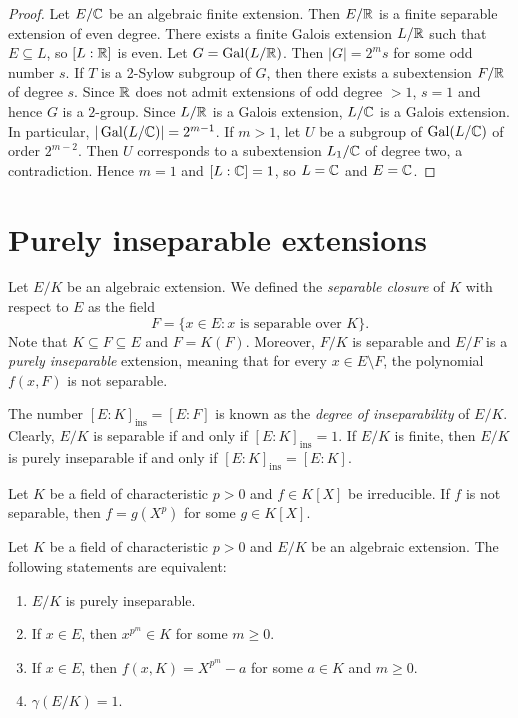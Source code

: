 \begin{proof}
    Let $E/\mathbb{C}$ be an algebraic finite extension. Then $E/\mathbb{R}$ 
    is a finite separable extension of even degree. There exists a finite Galois
    extension 
    $L/\mathbb{R}$ such that $E\subseteq L$, so $[L:\mathbb{R}]$ is even. Let $G=\operatorname{Gal}(L/\mathbb{R})$. 
    Then $|G|=2^ms$ for some odd number $s$. If $T$ is a 2-Sylow subgroup
    of $G$, 
    then there exists a subextension $F/\mathbb{R}$ of degree $s$. Since 
    $\mathbb{R}$ does not admit extensions of odd degree $>1$, $s=1$ and
    hence $G$ is a $2$-group. Since 
    $L/\mathbb{R}$ is a Galois extension, $L/\mathbb{C}$ is a Galois extension. 
    In particular, $|\operatorname{Gal}(L/\mathbb{C})|=2^{m-1}$. If $m>1$, 
    let $U$ be a subgroup of $\operatorname{Gal}(L/\mathbb{C})$ of order $2^{m-2}$. Then $U$ corresponds 
    to a subextension $L_1/\mathbb{C}$ of degree two, a contradiction. Hence $m=1$ 
    and $[L:\mathbb{C}]=1$, so $L=\mathbb{C}$ and $E=\mathbb{C}$. 
\end{proof}

\section{Purely inseparable extensions}

Let $E/K$ be an algebraic extension. 
We defined the 
\emph{separable closure} of $K$ with respect to $E$ as 
the field 
\[
    F=\{x\in E:x\text{ is separable over }K\}.
\]
Note that $K\subseteq F\subseteq E$ 
and $F=K(F)$. Moreover, 
$F/K$ is separable and 
$E/F$ is a \emph{purely inseparable} extension, meaning that
for every $x\in E\setminus F$, the polynomial $f(x,F)$ is not separable. 

The number $[E:K]_{\operatorname{ins}}=[E:F]$ is known as the
\emph{degree of inseparability} of $E/K$.
Clearly, $E/K$ is separable if and only if
$[E:K]_{\operatorname{ins}}=1$.
If $E/K$ is finite, then $E/K$ is purely inseparable if and only if
$[E:K]_{\operatorname{ins}}=[E:K]$.

\begin{exercise}
    \label{xca:separable_charp}
    Let $K$ be a field of characteristic $p>0$ and $f\in K[X]$ be irreducible.
    If $f$ is not separable, then $f=g(X^p)$ for some $g\in K[X]$. 
\end{exercise}



\begin{proposition}
Let $K$ be a field of characteristic $p>0$ and
$E/K$ be an algebraic extension. The following statements are equivalent:
\begin{enumerate}
    \item $E/K$ is purely inseparable.
    \item If $x\in E$, then $x^{p^m}\in K$ for some $m\geq0$.
    \item If $x\in E$, then $f(x,K)=X^{p^m}-a$ for some $a\in K$ and $m\geq0$. 
    \item $\gamma(E/K)=1$. 
\end{enumerate}
\end{proposition}

